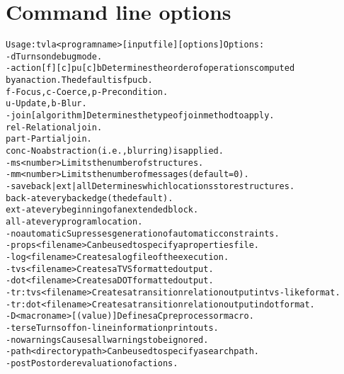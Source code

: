 \section{\label{Se:Command}Command line options}
\small
\begin{alltt}
Usage: tvla <program name> [input file] [options] Options:
 -d                      Turns on debug mode.
 -action [f][c]pu[c]b    Determines the order of operations computed
                         by an action. The default is fpucb.
                         f - Focus,  c - Coerce, p - Precondition.
                         u - Update, b - Blur.
 -join [algorithm]       Determines the type of join method to apply.
                         rel  - Relational join.
                         part - Partial join.
                         conc - No abstraction (i.e., blurring) is applied.
 -ms <number>            Limits the number of structures.
 -mm <number>            Limits the number of messages (default=0).
 -save {back|ext|all}    Determines which locations store structures.
                         back - at every back edge (the default).
                         ext  - at every beginning of an extended block.
                         all  - at every program location.
 -noautomatic            Supresses generation of automatic constraints.
 -props <file name>      Can be used to specify a properties file.
 -log <file name>        Creates a log file of the execution.
 -tvs <file name>        Creates a TVS formatted output.
 -dot <file name>        Creates a DOT formatted output.
 -tr:tvs <file name>     Creates a transition relation output in tvs-like format.
 -tr:dot <file name>     Creates a transition relation output in dot format.
 -D<macro name>[(value)] Defines a C preprocessor macro.
 -terse                  Turns off on-line information printouts.
 -nowarnings             Causes all warnings to be ignored.
 -path <directory path>  Can be used to specify a search path.
 -post                   Post order evaluation of actions.
\end{alltt}

